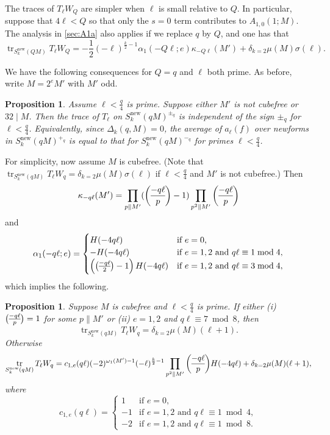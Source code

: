 \documentclass[11pt]{amsart}
\newcommand{\new}{\mathrm{new}}
\renewcommand{\mod}{\bmod}
\newcommand{\leg}{\overwithdelims ()}
\DeclareMathOperator{\tr}{tr}
\numberwithin{lem}{section}
\newtheorem{prop}[lem]{Proposition}
\theoremstyle{remark}
\theoremstyle{definition}
\numberwithin{equation}{section}
\begin{document}
The traces of $T_\ell W_Q$ are simpler when $\ell$ is small relative to $Q$.  In particular, suppose that $4\ell < Q$ so that only the $s=0$ term contributes to $A_{1,0}(1;M)$.  The analysis in \cref{sec:A1a} also applies if we replace $q$ by $Q$, and one has that
\begin{equation} \label{eq:lsmall}
 \tr_{S_k^\new(Q M)} T_\ell W_Q = - \frac 12 (-\ell)^{\frac k2 - 1} \alpha_1(-Q \ell; e) \kappa_{-Q \ell}(M') + \delta_{k=2}\mu(M) \sigma(\ell).
\end{equation}

We have the following consequences for $Q = q$ and $\ell$ both prime.
As before, write  $M = 2^e M'$ with $M'$ odd.

\begin{prop} Assume $\ell < \frac q4$ is prime.  Suppose either $M'$ is not cubefree or $32 \mid M$.  Then the trace of $T_\ell$ on $S_k^\new(q M)^{\pm_q}$ is independent of the sign $\pm_q$ for $\ell < \frac q4$.  Equivalently, since $\Delta_k(q,M) = 0$, the average of $a_\ell(f)$ over newforms in $S_k^\new(q M)^{+_q}$ is equal to that for $S_k^\new(q M)^{-_q}$ for primes $\ell < \frac q4$.
\end{prop}

For simplicity, now assume $M$ is cubefree.  (Note that
$\tr_{S_k^\new(q M)} T_\ell W_q = \delta_{k=2}\mu(M) \sigma(\ell)$ if $\ell < \frac q4$ and $M'$ is not cubefree.)
Then
\[ \kappa_{-q \ell}(M') = \prod_{p \parallel M'} ( {-q \ell \leg p} - 1) \prod_{p^2 \parallel M'} {-q\ell \leg p} \]
and
\[ \alpha_1(-q \ell ;e) = 
\begin{cases}
H(-4q \ell) & \text{if }e = 0, \\
-H(-4 q \ell) & \text{if }e = 1,2 \text{ and } q \ell \equiv 1 \mod 4,  \\
\left({-q \ell \leg 2} - 1 \right) H(-4 q \ell) & \text{if }e = 1,2 \text{ and } q \ell \equiv 3 \mod 4, 
\end{cases} \]
which implies the following.

\begin{prop} Suppose $M$ is cubefree and $\ell < \frac q4$ is prime.  If either
(i) ${-q \ell \leg p} = 1$  for some $p \parallel M'$ or (ii) $e = 1,2$ and $q \ell \equiv 7 \mod 8$, then
\[ \tr_{S_k^\new(q M)} T_\ell W_q = \delta_{k=2}\mu (M)(\ell + 1). \]
Otherwise
\[ 
\tr_{S_k^\new(q M)} T_\ell W_q = c_{1,e}(q\ell) (-2)^{\omega_1(M')-1} (-\ell)^{\frac k2 - 1}  \prod_{p^2 \parallel M'} {-q\ell \leg p}  H(-4 q \ell) + \delta_{k=2}\mu (M)(\ell + 1),
  \]
 where
 \[ c_{1,e}(q\ell) = 
\begin{cases}
1 & \text{if }e = 0, \\
-1 & \text{if }e = 1,2 \text{ and } q \ell \equiv 1 \mod 4,  \\
-2 & \text{if }e = 1,2 \text{ and } q \ell \equiv 1 \mod 8. 
\end{cases}  \]
\end{prop}
\end{document}
